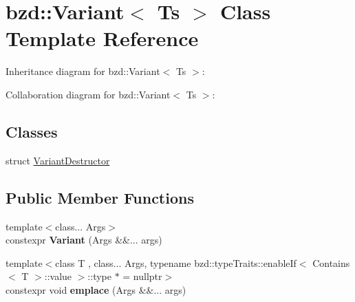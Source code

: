 \hypertarget{classbzd_1_1Variant}{}\section{bzd\+:\+:Variant$<$ Ts $>$ Class Template Reference}
\label{classbzd_1_1Variant}


Inheritance diagram for bzd\+:\+:Variant$<$ Ts $>$\+:


Collaboration diagram for bzd\+:\+:Variant$<$ Ts $>$\+:
\subsection*{Classes}
\begin{DoxyCompactItemize}
\item 
struct \hyperlink{structbzd_1_1Variant_1_1VariantDestructor}{Variant\+Destructor}
\end{DoxyCompactItemize}
\subsection*{Public Member Functions}
\begin{DoxyCompactItemize}
\item 
\mbox{\label{classbzd_1_1Variant_a2518455c1e6f8dadb0d2d0ec120efe78}} 
{\footnotesize template$<$class... Args$>$ }\\constexpr {\bfseries Variant} (Args \&\&... args)
\item 
\mbox{\label{classbzd_1_1Variant_ad01f13a03c20267f3ed1de5c9bede7dd}} 
{\footnotesize template$<$class T , class... Args, typename bzd\+::type\+Traits\+::enable\+If$<$ Contains$<$ T $>$\+::value $>$\+::type $\ast$  = nullptr$>$ }\\constexpr void {\bfseries emplace} (Args \&\&... args)
\end{DoxyCompactItemize}
